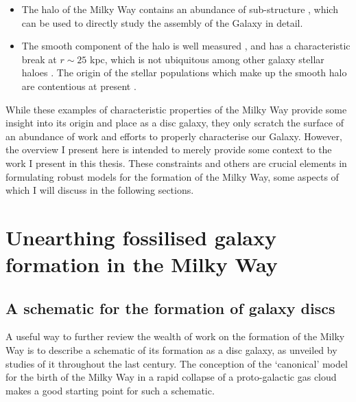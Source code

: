 \begin{itemize}
    \item The halo of the Milky Way contains an abundance of sub-structure \citep{2013NewAR..57..100B}, which can be used to directly study the assembly of the Galaxy in detail.
    \item The smooth component of the halo is well measured \citep[e.g.][]{2011MNRAS.416.2903D}, and has a characteristic break at $r\sim 25$ kpc, which is not ubiquitous among other galaxy stellar haloes \citep[e.g.][]{2013ApJ...763..113D}. The origin of the stellar populations which make up the smooth halo are contentious at present \citep[e.g.][]{2007Natur.450.1020C,2012ApJ...746...34B,2014ApJ...786....7S}.
\end{itemize}

While these examples of characteristic properties of the Milky Way provide some insight into its origin and place as a disc galaxy, they only scratch the surface of an abundance of work and efforts to properly characterise our Galaxy. However, the overview I present here is intended to merely provide some context to the work I present in this thesis. These constraints and others are crucial elements in formulating robust models for the formation of the Milky Way, some aspects of which I will discuss in the following sections.

\section{Unearthing fossilised galaxy formation in the Milky Way}
\label{sec:galacticarchaeology}
\subsection{A schematic for the formation of galaxy discs}

A useful way to further review the wealth of work on the formation of the Milky Way is to describe a schematic of its formation as a disc galaxy, as unveiled by studies of it throughout the last century. The conception of the `canonical' model for the birth of the Milky Way in a rapid collapse of a proto-galactic gas cloud \citep[the ELS model;][]{1962ApJ...136..748E} makes a good starting point for such a schematic. 

